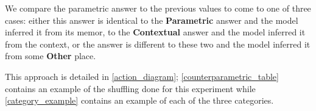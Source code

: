 We compare the parametric answer to the previous values to come to one of three cases: either this answer is identical to the \textbf{Parametric} answer and the model inferred it from its memor, to the \textbf{Contextual} answer and the model inferred it from the context, or the answer is different to these two and the model inferred it from some \textbf{Other} place.

This approach is detailed in \cref{action_diagram}; \cref{counterparametric_table} contains an example of the shuffling done for this experiment while \cref{category_example} contains an example of each of the three categories.

\begin{table}[htbp]
	\newcommand{\vwidth}[1]{\parbox{38ex}{\ttfamily #1}}
	\newcommand{\rep}[1]{{\setlength{\fboxsep}{0pt}\fcolorbox{Gray}{Gray!80}{\textit{#1}}}}

	\centering
	\scriptsize


\end{table}
